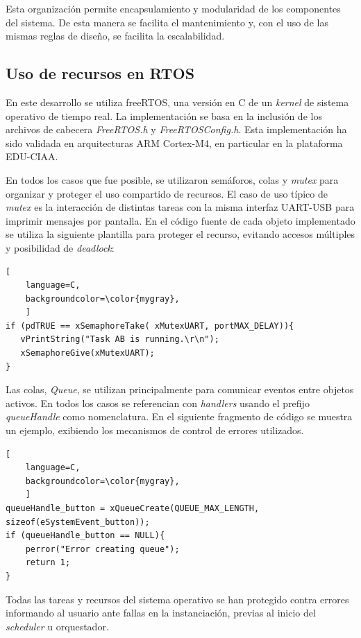 Esta organización permite encapsulamiento y modularidad de los componentes del sistema. De esta manera se facilita el mantenimiento y, con el uso de las mismas reglas de diseño, se facilita la escalabilidad.\\

\subsection{Uso de recursos en RTOS}

En este desarrollo se utiliza freeRTOS, una versión en C de un \textit{kernel} de sistema operativo de tiempo real. La implementación se basa en la inclusión de los archivos de cabecera \textit{FreeRTOS.h} y \textit{FreeRTOSConfig.h}. Esta implementación ha sido validada en arquitecturas ARM Cortex-M4, en particular en la plataforma EDU-CIAA. 

En todos los casos que fue posible, se utilizaron semáforos, colas y \textit{mutex} para organizar y proteger el uso compartido de recursos. El caso de uso típico de \textit{mutex} es la interacción de distintas tareas con la misma interfaz UART-USB para imprimir mensajes por pantalla. En el código fuente de cada objeto implementado se utiliza la siguiente plantilla para proteger el recurso, evitando accesos múltiples y posibilidad de \textit{deadlock}:\\

\begin{lstlisting}[
	language=C, 
	backgroundcolor=\color{mygray},
	]
if (pdTRUE == xSemaphoreTake( xMutexUART, portMAX_DELAY)){
   vPrintString("Task AB is running.\r\n");
   xSemaphoreGive(xMutexUART);
}
\end{lstlisting}

Las colas, \textit{Queue}, se utilizan principalmente para comunicar eventos entre objetos activos. En todos los casos se referencian con \textit{handlers} usando el prefijo \textit{queueHandle} como nomenclatura. En el siguiente fragmento de código se muestra un ejemplo, exibiendo los mecanismos de control de errores utilizados. \\

\begin{lstlisting}[
	language=C, 
	backgroundcolor=\color{mygray},
	]
queueHandle_button = xQueueCreate(QUEUE_MAX_LENGTH, sizeof(eSystemEvent_button));
if (queueHandle_button == NULL){
    perror("Error creating queue");
    return 1;
}
\end{lstlisting}


Todas las tareas y recursos del sistema operativo se han protegido contra errores informando al usuario ante fallas en la instanciación, previas al inicio del \textit{scheduler} u orquestador.

